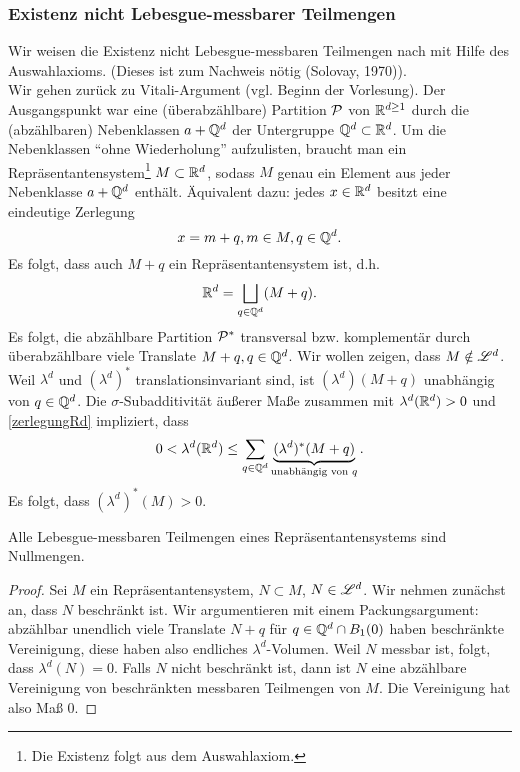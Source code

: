 \subsubsection{Existenz nicht Lebesgue-messbarer Teilmengen}
Wir weisen die Existenz nicht Lebesgue-messbaren Teilmengen nach mit Hilfe des Auswahlaxioms. (Dieses ist zum Nachweis nötig (Solovay, 1970)).\vspace{0.5pc}\\
Wir gehen zurück zu Vitali-Argument (vgl. Beginn der Vorlesung). Der Ausgangspunkt war eine (überabzählbare) Partition $\mathcal{P}$ von $\mathbb{R}^{d\geq 1}$ durch die (abzählbaren) Nebenklassen $a+\mathbb{Q}^d$ der Untergruppe $\mathbb{Q}^d \subset \mathbb{R}^d$. Um die Nebenklassen ``ohne Wiederholung'' aufzulisten, braucht man ein Repräsentantensystem\footnote{Die Existenz folgt aus dem Auswahlaxiom.} $M\subset \mathbb{R}^d$, sodass $M$ genau ein Element aus jeder Nebenklasse $a+\mathbb{Q}^d$ enthält. Äquivalent dazu: jedes $x\in\mathbb{R}^d$ besitzt eine eindeutige Zerlegung
$$
{x=m+q, m\in M, q\in \mathbb{Q}^d}.
$$
Es folgt, dass auch $M+q$ ein Repräsentantensystem ist, d.h.
\begin{equation}\label{zerlegungRd}
\mathbb{R}^d = \bigsqcup_{q\in\mathbb{Q}^d} (M+q).
\end{equation}
Es folgt, die abzählbare Partition $\mathcal{P}^*$ transversal bzw. komplementär durch überabzählbare viele Translate $M+q, q\in \mathbb{Q}^d$. Wir wollen zeigen, dass $M\notin \mathscr{L}^d$. Weil $\lambda^d$ und $(\lambda^d)^*$ translationsinvariant sind, ist $(\lambda^d)(M+q)$ unabhängig von $q\in \mathbb{Q}^d$. Die $\sigma$-Subadditivität äußerer Maße zusammen mit $\lambda^d(\mathbb{R}^d)>0$ und \eqref{zerlegungRd} impliziert, dass
$$
0<\lambda^d(\mathbb{R}^d)\leq \sum_{q\in\mathbb{Q}^d} \underbrace{(\lambda^d)^*(M+q)}_{\text{unabhängig von }q}.
$$
Es folgt, dass $(\lambda^d)^*(M)>0$.

\begin{satz}
\begin{mdframed}
Alle Lebesgue-messbaren Teilmengen eines Repräsentantensystems sind Nullmengen.
\end{mdframed}
\begin{proof}
Sei $M$ ein Repräsentantensystem, $N\subset M$, $N\in \mathscr{L}^d$. Wir nehmen zunächst an, dass $N$ beschränkt ist. Wir argumentieren mit einem Packungsargument: abzählbar unendlich viele Translate $N+q$ für $q\in \mathbb{Q}^d \cap B_1(0)$ haben beschränkte Vereinigung, diese haben also endliches $\lambda^d$-Volumen. Weil $N$ messbar ist, folgt, dass $\lambda^d(N)=0$. Falls $N$ nicht beschränkt ist, dann ist $N$ eine abzählbare Vereinigung von beschränkten messbaren Teilmengen von $M$. Die Vereinigung hat also Maß $0$. 
\end{proof}
\end{satz}

